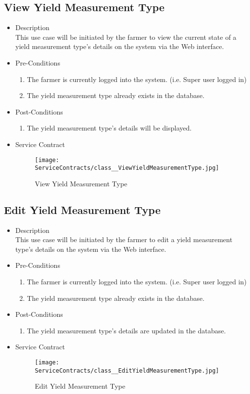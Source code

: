 \documentclass[11pt,fleqn]{book} %
\begin{document}
\subsection{View Yield Measurement Type}
\begin{itemize}
	\item Description\\
	This use case will be initiated by the farmer to view the current state of a yield measurement type’s details on the system via the Web interface.
	\item Pre-Conditions
	\begin{enumerate}
		\item The farmer is currently logged into the system. (i.e. Super user logged in)
		\item The yield measurement type already exists in the database.		
	\end{enumerate}
	\item Post-Conditions
	\begin{enumerate}
		\item The yield measurement type’s details will be displayed.
	\end{enumerate}
	\item Service Contract
	\begin{figure}
		\texttt{[image: ServiceContracts/class\_\_ViewYieldMeasurementType.jpg]}
		\caption{View Yield Measurement Type}
	\end{figure}
\end{itemize}

\subsection{Edit Yield Measurement Type}
\begin{itemize}
	\item Description\\
	This use case will be initiated by the farmer to edit a yield measurement type’s details on the system via the Web interface.
	\item Pre-Conditions
	\begin{enumerate}
		\item The farmer is currently logged into the system. (i.e. Super user logged in)
		\item The yield measurement type already exists in the database.					
	\end{enumerate}
	\item Post-Conditions
	\begin{enumerate}
		\item The yield measurement type’s details are updated in the database.
	\end{enumerate}
	\item Service Contract
	\begin{figure}
		\texttt{[image: ServiceContracts/class\_\_EditYieldMeasurementType.jpg]}
		\caption{Edit Yield Measurement Type}
	\end{figure}
\end{itemize}
\end{document}
